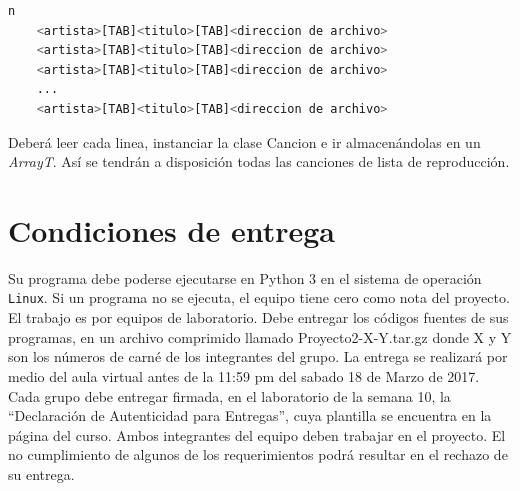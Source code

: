 \documentclass[10pt, letterpaper]{article}
\begin{document}
\begin{center}
\begin{lstlisting}[language=Python,frame=single]
    n
    <artista>[TAB]<titulo>[TAB]<direccion de archivo>
    <artista>[TAB]<titulo>[TAB]<direccion de archivo>
    <artista>[TAB]<titulo>[TAB]<direccion de archivo>
    ...
    <artista>[TAB]<titulo>[TAB]<direccion de archivo>
\end{lstlisting}
\end{center}

Deberá leer cada linea, instanciar la clase Cancion e ir almacenándolas en un \textit{ArrayT}. Así se tendrán a disposición todas las canciones de lista de reproducción.

\section*{Condiciones de entrega}
Su programa debe poderse ejecutarse en Python 3 en el sistema de operación \texttt{Linux}. Si un programa no se ejecuta, el equipo tiene cero como nota del proyecto. El trabajo es por equipos de laboratorio. Debe entregar los códigos fuentes de sus programas, en un archivo comprimido llamado Proyecto2-X-Y.tar.gz donde X y Y son los números de carné de los integrantes del grupo. La entrega se realizará por medio del aula virtual antes de la 11:59 pm del sabado 18 de Marzo de 2017. Cada grupo debe entregar firmada, en el laboratorio de la semana 10, la “Declaración de Autenticidad para Entregas”, cuya plantilla se encuentra en la página del curso. Ambos integrantes del equipo deben trabajar en el proyecto. El no cumplimiento de algunos de los requerimientos podrá resultar en el rechazo de su entrega.



\printbibliography
\end{document}
